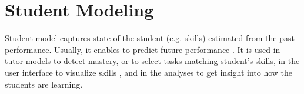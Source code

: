 %



\section{Student Modeling}
\label{sec:student-modeling}

Student model captures state of the student (e.g. skills) estimated from the
past performance. Usually, it enables to predict future performance
\cite{its-learner-models, student-models-review-2012, pelanek-learner-modeling}.
It is used in tutor models to detect mastery, or to select tasks matching
student's skills, in the user interface to visualize skills \cite{instructor-dashboard-realtime},
and in the analyses to get insight into how the students are learning.  %

